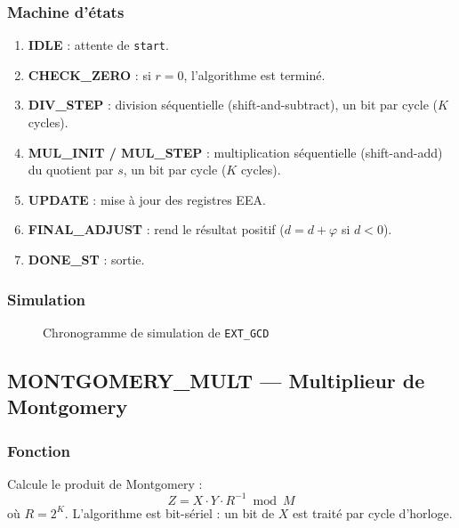 \documentclass[12pt,a4paper]{report}
\begin{document}
\subsubsection{Machine d'états}
\begin{enumerate}
  \item \textbf{IDLE} : attente de \texttt{start}.
  \item \textbf{CHECK\_ZERO} : si $r = 0$, l'algorithme est terminé.
  \item \textbf{DIV\_STEP} : division séquentielle (shift-and-subtract),
        un bit par cycle ($K$ cycles).
  \item \textbf{MUL\_INIT / MUL\_STEP} : multiplication séquentielle
        (shift-and-add) du quotient par $s$, un bit par cycle ($K$ cycles).
  \item \textbf{UPDATE} : mise à jour des registres EEA.
  \item \textbf{FINAL\_ADJUST} : rend le résultat positif ($d = d + \varphi$
        si $d < 0$).
  \item \textbf{DONE\_ST} : sortie.
\end{enumerate}

\subsubsection{Simulation}
\begin{figure}[H]
\centering
{}
\caption{Chronogramme de simulation de \texttt{EXT\_GCD}}
\label{fig:sim_gcd}
\end{figure}

\subsection{MONTGOMERY\_MULT --- Multiplieur de Montgomery}
\label{sec:mont_mult}

\subsubsection{Fonction}
Calcule le produit de Montgomery :
\[
  Z = X \cdot Y \cdot R^{-1} \bmod M
\]
où $R = 2^K$. L'algorithme est bit-sériel : un bit de $X$ est traité par
cycle d'horloge.
\end{document}
